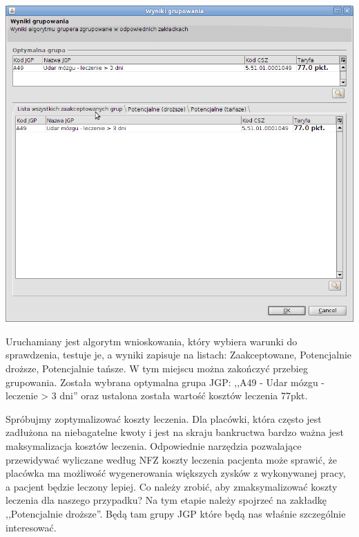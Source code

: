 \includegraphics[scale=0.4]{images/gruper9}

Uruchamiany jest algorytm wnioskowania, który wybiera warunki do sprawdzenia, testuje je, a wyniki zapisuje na listach: Zaakceptowane, Potencjalnie droższe, Potencjalnie tańsze. W tym miejscu można zakończyć przebieg grupowania. Została wybrana optymalna grupa JGP: ,,A49 - Udar mózgu - leczenie > 3 dni'' oraz ustalona została wartość kosztów leczenia 77pkt.

Spróbujmy zoptymalizować koszty leczenia. Dla placówki, która często jest zadłużona na niebagatelne kwoty i jest na skraju bankructwa bardzo ważna jest maksymalizacja kosztów leczenia. Odpowiednie narzędzia pozwalające przewidywać wyliczane według NFZ koszty leczenia pacjenta może sprawić, że placówka ma możliwość wygenerowania większych zysków z wykonywanej pracy, a pacjent będzie leczony lepiej. Co należy zrobić, aby zmaksymalizować koszty leczenia dla naszego przypadku? Na tym etapie należy spojrzeć na zakładkę ,,Potencjalnie droższe''. Będą tam grupy JGP które będą nas właśnie szczególnie interesować.

